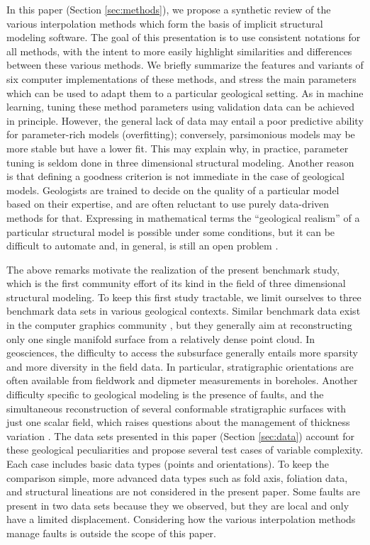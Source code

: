 \documentclass[final]{ring20}
\begin{document}
In this paper (Section \ref{sec:methods}), we propose a synthetic review of the various interpolation methods which form the basis of implicit structural modeling software. The goal of this presentation is to use consistent notations for all methods, with the intent to more easily highlight similarities and differences between these various methods. We briefly summarize the features and variants of six computer implementations of these methods, and stress the main parameters which can be used to adapt them to a particular geological setting. As in machine learning, tuning these method parameters using validation data can be achieved in principle. However, the general lack of data may entail a poor predictive ability for parameter-rich models (overfitting); conversely, parsimonious models may be more stable but have a lower fit. This may explain why, in practice, parameter tuning is seldom done in three dimensional structural modeling. Another reason is that defining a goodness criterion is not immediate in the case of geological models. Geologists are trained to decide on the quality of a particular model based on their expertise, and are often reluctant to use purely data-driven methods for that. Expressing in mathematical terms the ``geological realism'' of a particular structural model is possible under some conditions, but it can be difficult to automate and, in general, is still an open problem \citep{Caumon2010MG}. 

The above remarks motivate the realization of the present benchmark study, which is the first community effort of its kind in the field of three dimensional structural modeling. To keep this first study tractable, we limit ourselves to three benchmark data sets in various geological contexts. Similar benchmark data exist in the computer graphics community \citep[e.g.,][]{BLNTS13}, but they generally aim at reconstructing only one single manifold surface from a relatively dense point cloud. In geosciences, the difficulty to access the subsurface generally entails more sparsity and more diversity in the field data. In particular, stratigraphic orientations are often available from fieldwork and dipmeter measurements in boreholes. Another difficulty specific to geological modeling is the presence of faults, and the simultaneous reconstruction of several conformable stratigraphic surfaces with just one scalar field, which raises questions about the management of thickness variation \citep{Laurent2016MG}. The data sets presented in this paper (Section \ref{sec:data}) account for these geological peculiarities and propose several test cases of variable complexity. Each case includes basic data types (points and orientations). To keep the comparison simple, more advanced data types such as fold axis, foliation data, and structural lineations are not considered in the present paper. Some faults are present in two data sets because they we observed, but they are local and only have a limited displacement. Considering how the various interpolation methods manage faults is outside the scope of this paper. 
\end{document}
